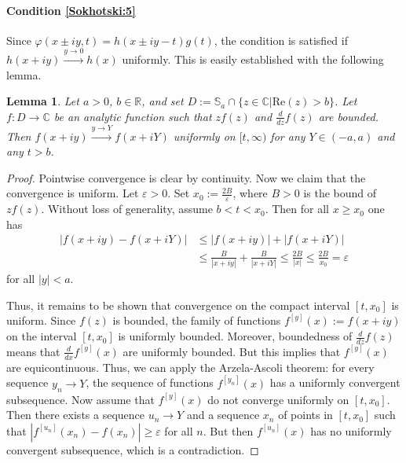 \documentclass[12pt]{article}
\theoremstyle{plain}
\newtheorem{lemma}[theorem]{Lemma}
\theoremstyle{definition}
\numberwithin{equation}{section}
\numberwithin{theorem}{section}
\begin{document}
\paragraph{Condition \ref{Sokhotski:5}}
Since $\varphi(x\pm iy,t)=h(x\pm iy -t)g(t)$, the condition is satisfied if $h(x+iy)\xrightarrow{y\to 0}h(x)$ uniformly. This is easily established with the following lemma. 


\begin{lemma} \label{UniformConvergenceOfAnalyticFuns} Let $a>0$, $b\in\mathbb{R}$, and set $D:=\mathbb{S}_a\cap\lbrace z\in\mathbb{C}|\mathrm{Re}(z)> b\rbrace$. Let $f:D\rightarrow \mathbb{C}$ be an analytic function such that $zf(z)$ and $\frac{d}{dz}f(z)$ are bounded. Then $f(x+iy)\xrightarrow{y\to Y}f(x+iY)$ uniformly on $[t,\infty)$ for any $Y\in(-a,a)$ and any $t>b$.
\end{lemma}

\begin{proof}
Pointwise convergence is clear by continuity. Now we claim that the convergence is uniform. Let $\varepsilon>0$. Set $x_0:=\frac{2B}{\varepsilon}$, where $B>0$ is the bound of $zf(z)$. Without loss of generality, assume $b<t<x_0$. Then for all $x\geq x_0$ one has \begin{align*}\left|f(x+iy)-f(x+iY)\right| 
&\leq \left|f(x+iy)\right|+\left|f(x+iY)\right| \\
&\leq \frac{B}{|x+iy|}+\frac{B}{|x+iY|} \leq \frac{2B}{|x|} \leq\frac{2B}{x_0} =\varepsilon
\end{align*} for all $|y|<a$.

Thus, it remains to be shown that convergence on the compact interval $[t,x_0]$ is uniform. Since $f(z)$ is bounded, the family of functions $f^{[y]}(x):=f(x+iy)$ on the interval $[t,x_0]$ is uniformly bounded. Moreover, boundedness of $\frac{d}{dz}f(z)$ means that $\frac{d}{dx}f^{[y]}(x)$ are uniformly bounded. But this implies that $f^{[y]}(x)$ are equicontinuous. Thus, we can apply the Arzela-Ascoli theorem: for every sequence $y_n\rightarrow Y$, the sequence of functions $f^{[y_n]}(x)$ has a uniformly convergent subsequence. Now assume that $f^{[y]}(x)$ do not converge uniformly on $[t,x_0]$. 
Then there exists a sequence $u_n\rightarrow Y$ and a sequence $x_n$ of points in $[t,x_0]$ such that $\left|f^{[u_n]}(x_n)-f(x_n)\right| \geq\varepsilon$ for all $n$. But then $f^{[u_n]}(x)$ has no uniformly convergent subsequence, which is a contradiction.
\end{proof}
\end{document}
